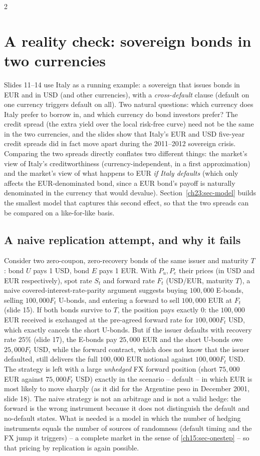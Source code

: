 \begin{paracol}{2}
\section{A reality check: sovereign bonds in two currencies}\label{ch23:sec-italy}
Slides 11--14 use Italy as a running example: a sovereign that issues bonds in EUR and in USD (and other
currencies), with a \emph{cross-default} clause (default on one currency triggers default on all). Two natural
questions: which currency does Italy prefer to borrow in, and which currency do bond investors prefer? The credit
spread (the extra yield over the local risk-free curve) need not be the same in the two currencies, and the slides
show that Italy's EUR and USD five-year credit spreads did in fact move apart during the 2011--2012 sovereign
crisis. Comparing the two spreads directly conflates two different things: the market's view of Italy's
creditworthiness (currency-independent, in a first approximation) and the market's view of what happens to EUR
\emph{if Italy defaults} (which only affects the EUR-denominated bond, since a EUR bond's payoff is naturally
denominated in the currency that would devalue). Section~\ref{ch23:sec-model} builds the smallest model that
captures this second effect, so that the two spreads can be compared on a like-for-like basis.

\subsection{A naive replication attempt, and why it fails}\label{ch23:sec-naive}
Consider two zero-coupon, zero-recovery bonds of the same issuer and maturity $T$: bond $U$ pays 1 USD, bond $E$
pays 1 EUR. With $P_u,P_e$ their prices (in USD and EUR respectively), spot rate $S_t$ and forward rate $F_t$
(USD/EUR, maturity $T$), a naive covered-interest-rate-parity argument suggests buying $100{,}000$ E-bonds, selling
$100{,}000F_t$ U-bonds, and entering a forward to sell $100{,}000$ EUR at $F_t$ (slide 15). If both
bonds survive to $T$, the position pays exactly $0$: the $100{,}000$ EUR received is exchanged at the pre-agreed forward
rate for $100{,}000F_t$ USD, which exactly cancels the short U-bonds. But if the issuer defaults with recovery rate $25\%$
(slide 17), the E-bonds pay $25{,}000$ EUR and the short U-bonds owe $25{,}000F_t$ USD, while the forward contract,
which does not know that the issuer defaulted, still delivers the full $100{,}000$ EUR notional against $100{,}000F_t$ USD.
The strategy is left with a large \emph{unhedged} FX forward position (short $75{,}000$ EUR against $75{,}000F_t$ USD) exactly in the scenario -- default -- in
which EUR is most likely to move sharply (as it did for the Argentine peso in December 2001, slide 18). The naive
strategy is not an arbitrage and is not a valid hedge: the forward is the wrong instrument because it does not
distinguish the default and no-default states. What is needed is a model in which the number of hedging
instruments equals the number of sources of randomness (default timing and the FX jump it triggers) -- a complete
market in the sense of \cref{ch15:sec-onestep} -- so that pricing by replication is again possible.

\end{paracol}
